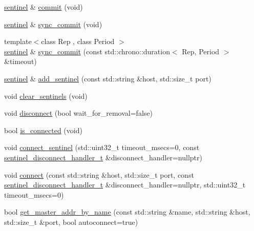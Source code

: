 \begin{DoxyCompactItemize}
\item 
\hyperlink{classcpp__redis_1_1sentinel}{sentinel} \& \hyperlink{classcpp__redis_1_1sentinel_ad4f85d486499f82225b244f85091b31e}{commit} (void)
\item 
\hyperlink{classcpp__redis_1_1sentinel}{sentinel} \& \hyperlink{classcpp__redis_1_1sentinel_a8e4d231ac89510c337fe97fe9e642785}{sync\+\_\+commit} (void)
\item 
{\footnotesize template$<$class Rep , class Period $>$ }\\\hyperlink{classcpp__redis_1_1sentinel}{sentinel} \& \hyperlink{classcpp__redis_1_1sentinel_afbaa0b80266f70ad98c0bf8f28c533ab}{sync\+\_\+commit} (const std\+::chrono\+::duration$<$ Rep, Period $>$ \&timeout)
\item 
\hyperlink{classcpp__redis_1_1sentinel}{sentinel} \& \hyperlink{classcpp__redis_1_1sentinel_a548dad45711dc2e7da7e0803d5a74a2e}{add\+\_\+sentinel} (const std\+::string \&host, std\+::size\+\_\+t port)
\item 
void \hyperlink{classcpp__redis_1_1sentinel_ac36640b3f392970c72f5a513a2d61ac7}{clear\+\_\+sentinels} (void)
\item 
void \hyperlink{classcpp__redis_1_1sentinel_af607d8c5a20ada35daad251f1b1b2f68}{disconnect} (bool wait\+\_\+for\+\_\+removal=false)
\item 
bool \hyperlink{classcpp__redis_1_1sentinel_aa98a0593e6e7c04d8d0dd1f292cdce47}{is\+\_\+connected} (void)
\item 
void \hyperlink{classcpp__redis_1_1sentinel_ad10e26012984341c82dd4c6a7ef2253b}{connect\+\_\+sentinel} (std\+::uint32\+\_\+t timeout\+\_\+msecs=0, const \hyperlink{classcpp__redis_1_1sentinel_a923e06b5b700c16dffec8a01d2fa9aa4}{sentinel\+\_\+disconnect\+\_\+handler\+\_\+t} \&disconnect\+\_\+handler=nullptr)
\item 
void \hyperlink{classcpp__redis_1_1sentinel_a1dfba8240daf7cfa7502f57957cffbda}{connect} (const std\+::string \&host, std\+::size\+\_\+t port, const \hyperlink{classcpp__redis_1_1sentinel_a923e06b5b700c16dffec8a01d2fa9aa4}{sentinel\+\_\+disconnect\+\_\+handler\+\_\+t} \&disconnect\+\_\+handler=nullptr, std\+::uint32\+\_\+t timeout\+\_\+msecs=0)
\item 
bool \hyperlink{classcpp__redis_1_1sentinel_a2886493b40b00dfafdd3b22dfe28e0c3}{get\+\_\+master\+\_\+addr\+\_\+by\+\_\+name} (const std\+::string \&name, std\+::string \&host, std\+::size\+\_\+t \&port, bool autoconnect=true)
\item 
\mbox{\label{classcpp__redis_1_1sentinel_aaed03955e468d9f7c3df37376ecafc3a}} 

\end{DoxyCompactItemize}
